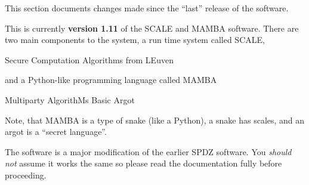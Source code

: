
This section documents changes made since the ``last'' release of
the software.

\vspace{5mm}

\noindent
This is currently {\bf version 1.11} of the SCALE and MAMBA software.
There are two main components to the system, a run time system called
SCALE,
\begin{center}
  Secure Computation Algorithms from LEuven
\end{center}
and a Python-like programming language called MAMBA
\begin{center}
  Multiparty AlgorithMs Basic Argot
\end{center}
Note, that MAMBA is a type of snake (like a Python), a snake
has scales, and an argot is a ``secret language''.

\vspace{5mm}

\noindent
The software is a major modification of the earlier SPDZ software.
You {\em should not} assume it works the same so please read
the documentation fully before proceeding.



